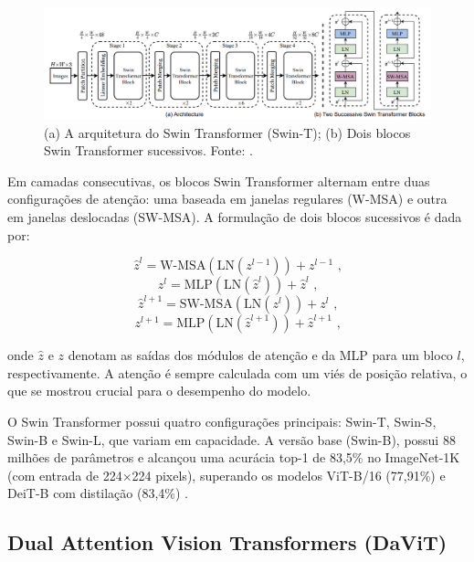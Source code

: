 \begin{figure}[!htbp]
    \centering
    \includegraphics[width=\linewidth]{figs/swin_t-arch.png}
    \caption{(a) A arquitetura do Swin Transformer (Swin-T); (b) Dois blocos Swin Transformer sucessivos. Fonte: .}
    \label{fig:swin-t-arch}
\end{figure}

Em camadas consecutivas, os blocos Swin Transformer alternam entre duas configurações de atenção: uma baseada em janelas regulares (W-MSA) e outra em janelas deslocadas (SW-MSA). A formulação de dois blocos sucessivos é dada por:

\begin{equation}
    \hat{z}^{l} = \text{W-MSA}(\text{LN}(z^{l-1}))+z^{l-1} \text{ ,}
\end{equation}
\begin{equation}
    z^{l} = \text{MLP}(\text{LN}(\hat{z}^{l}))+\hat{z}^{l} \text{ ,}
\end{equation}
\begin{equation}
    \hat{z}^{l+1} = \text{SW-MSA}(\text{LN}(z^{l}))+z^{l} \text{ ,}
\end{equation}
\begin{equation}
    z^{l+1} = \text{MLP}(\text{LN}(\hat{z}^{l+1}))+\hat{z}^{l+1} \text{ ,}
\end{equation}

onde $\hat{z}$ e $z$ denotam as saídas dos módulos de atenção e da MLP para um bloco $l$, respectivamente. A atenção é sempre calculada com um viés de posição relativa, o que se mostrou crucial para o desempenho do modelo.

O Swin Transformer possui quatro configurações principais: Swin-T, Swin-S, Swin-B e Swin-L, que variam em capacidade. A versão base (Swin-B), possui 88 milhões de parâmetros e alcançou uma acurácia top-1 de 83,5\% no ImageNet-1K (com entrada de 224×224 pixels), superando os modelos ViT-B/16 (77,91\%) e DeiT-B com distilação (83,4\%) \cite{Dosovitskiy2021, Touvron2021}.

\subsection{Dual Attention Vision Transformers (DaViT)}

